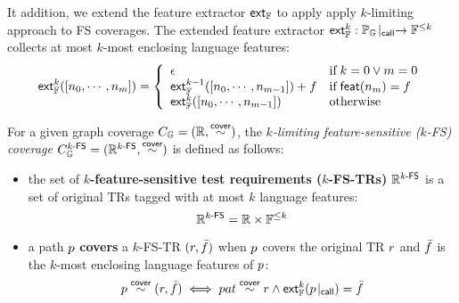 It addition, we extend the feature extractor $\textsf{ext}_{\mathbb{F}}$ to apply apply
$k$-limiting approach to FS coverages. The extended feature extractor
$\textsf{ext}_{\mathbb{F}}^{k}: {\mathbb{P}_{\mathbb{G}}}\!\mid_{\textsf{call}} \rightarrow \mathbb{F}^{\leq k}$ collects at
most $k$-most enclosing language features:
%
\begin{equation}\label{equ:extfeats}
  \textsf{ext}_{\mathbb{F}}^{k}([n_0, \cdots, n_m]) = \left\{
    \begin{array}{ll}
      \epsilon & \text{if} \; k = 0 \vee m = 0\\

      \textsf{ext}_{\mathbb{F}}^{k-1}([n_0, \cdots, n_{m-1}]) + f & \text{if} \;
      \textsf{feat}(n_m) = f\\

      \textsf{ext}_{\mathbb{F}}^{k}([n_0, \cdots, n_{m-1}]) & \text{otherwise}\\
    \end{array}
  \right.
\end{equation}

\begin{definition}\label{def:k-fs-cov}
  For a given graph coverage $C_{\mathbb{G}} = (\mathbb{R}, \overset{\textsf{cover}}{\sim})$, the
  \textit{$k$-limiting feature-sensitive ($k$-FS) coverage} $C_{\mathbb{G}}^{{k}\textsf{-FS}} =
  (\mathbb{R}^{{k}\textsf{-FS}}, \overset{\textsf{cover}}{\sim})$ is defined as follows:
  \begin{itemize}
    \item the set of \textbf{$k$-feature-sensitive test requirements
      ($k$-FS-TRs)} $\mathbb{R}^{{k}\textsf{-FS}}$ is a set of original TRs tagged with
      at most $k$ language features:
      \[
        \mathbb{R}^{{k}\textsf{-FS}} = \mathbb{R} \times \mathbb{F}^{\leq k}
      \]
    \item a path $p$ \textbf{covers} a $k$-FS-TR $(r, \bar{f})$ when $p$
      covers the original TR $r$ and $\bar{f}$ is the $k$-most enclosing
      language features of $p$:
      \[
        p \overset{\textsf{cover}}{\sim} (r, \bar{f}) \iff pat \overset{\textsf{cover}}{\sim} r \wedge
        \textsf{ext}_{\mathbb{F}}^{k}({p}\!\mid_{\textsf{call}}) = \bar{f}
      \]
  \end{itemize}
\end{definition}


